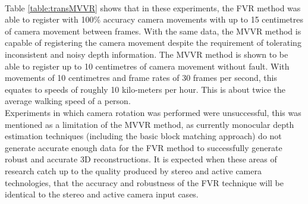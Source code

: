 \begin{table}[!htb]
\centering
{}
\\
\caption{Translation Tracking Error for FVR and MVVR}
\label{table:transMVVR}
\end{table}


Table \ref{table:transMVVR} shows that in these experiments, the FVR method was able to register with 100\% accuracy camera movements with up to 15 centimetres of camera movement between frames. With the same data, the MVVR method is capable of registering the camera movement despite the requirement of tolerating inconsistent and noisy depth information. The MVVR method is shown to be able to register up to 10 centimetres of camera movement without fault. With movements of 10 centimetres and frame rates of 30 frames per second, this equates to speeds of roughly 10 kilo-meters per hour. This is about twice the average walking speed of a person. \\

Experiments in which camera rotation was performed were unsuccessful, this was mentioned as a limitation of the MVVR method, as currently monocular depth estimation techniques (including the basic block matching approach) do not generate accurate enough data for the FVR method to successfully generate robust and accurate 3D reconstructions. It is expected when these areas of research catch up to the quality produced by stereo and active camera technologies, that the accuracy and robustness of the FVR technique will be identical to the stereo and active camera input cases. \\
